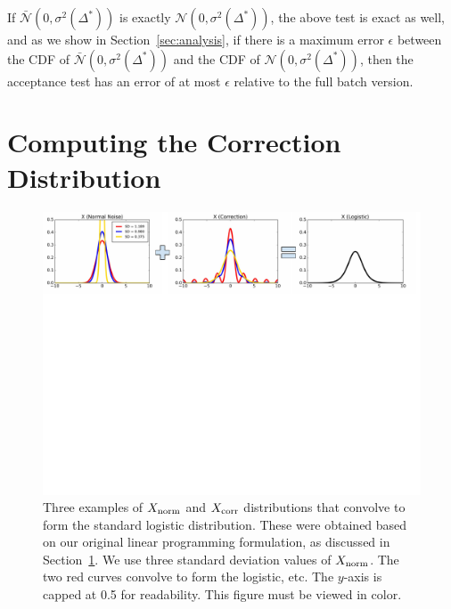 \documentclass{article}
\begin{document}
If $\mathcal{\bar{N}}(0, \sigma^2(\Delta^*))$ is exactly $\mathcal{N}(0,
\sigma^2(\Delta^*))$, the above test is exact as well, and as we show in
Section~\ref{sec:analysis}, if there is a maximum error $\epsilon$ between the
CDF of $\mathcal{\bar{N}}(0, \sigma^2(\Delta^*))$ and the CDF of $\mathcal{N}(0,
\sigma^2(\Delta^*))$, then the acceptance test has an error of at most
$\epsilon$ relative to the full batch version.




\section{Computing the Correction Distribution}\label{sec:correction}

\begin{figure}[t]
    \centering
    \includegraphics[width=1\textwidth]{mh_convolution_diagram_v2}
    \caption{
    Three examples of $X_{\rm norm}$ and $X_{\rm corr}$ distributions that
    convolve to form the standard logistic distribution. These were obtained
    based on our original linear programming formulation, as discussed in
    Section~\ref{sec:correction}. We use three standard deviation values of
    $X_{\rm norm}$. The two red curves convolve to form the logistic, etc. The
    $y$-axis is capped at 0.5 for readability. This figure must be viewed in
    color.
    }
    \label{fig:deconvolution}
\end{figure}
\end{document}
